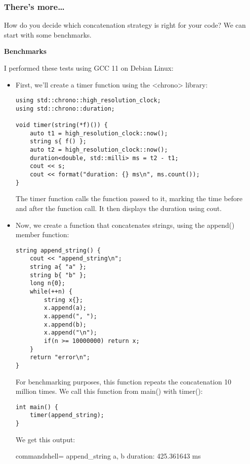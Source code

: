 \subsubsection{There's more…}

How do you decide which concatenation strategy is right for your code? We can start with some benchmarks.

\noindent
\textbf{Benchmarks}

I performed these tests using GCC 11 on Debian Linux:

\begin{itemize}
\item 
First, we'll create a timer function using the <chrono> library:

\begin{lstlisting}[style=styleCXX]
using std::chrono::high_resolution_clock;
using std::chrono::duration;

void timer(string(*f)()) {
	auto t1 = high_resolution_clock::now();
	string s{ f() };
	auto t2 = high_resolution_clock::now();
	duration<double, std::milli> ms = t2 - t1;
	cout << s;
	cout << format("duration: {} ms\n", ms.count());
}
\end{lstlisting}

The timer function calls the function passed to it, marking the time before and after the function call. It then displays the duration using cout.

\item 
Now, we create a function that concatenates strings, using the append() member function:

\begin{lstlisting}[style=styleCXX]
string append_string() {
	cout << "append_string\n";
	string a{ "a" };
	string b{ "b" };
	long n{0};
	while(++n) {
		string x{};
		x.append(a);
		x.append(", ");
		x.append(b);
		x.append("\n");
		if(n >= 10000000) return x;
	}
	return "error\n";
}
\end{lstlisting}

For benchmarking purposes, this function repeats the concatenation 10 million times. We call this function from main() with timer():

\begin{lstlisting}[style=styleCXX]
int main() {
	timer(append_string);
}
\end{lstlisting}

We get this output:

\begin{tcblisting}{commandshell={}}
append_string
a, b
duration: 425.361643 ms
\end{tcblisting}


\end{itemize}
